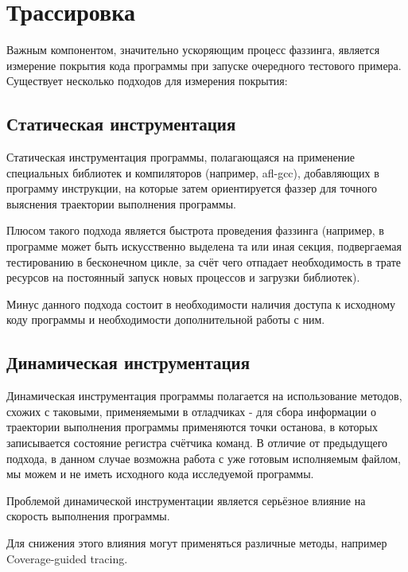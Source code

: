 \section{Трассировка}

Важным компонентом, значительно ускоряющим процесс фаззинга, является измерение покрытия кода программы при запуске очередного тестового примера. Существует несколько подходов для измерения покрытия:


\subsection{Статическая инструментация}

Статическая инструментация программы, полагающаяся на применение специальных библиотек и компиляторов (например, afl-gcc), добавляющих в программу инструкции, на которые затем ориентируется фаззер для точного выяснения траектории выполнения программы.  

Плюсом такого подхода является быстрота проведения фаззинга (например, в программе может быть искусственно выделена та или иная секция, подвергаемая тестированию в бесконечном цикле, за счёт чего отпадает необходимость в трате ресурсов на постоянный запуск новых процессов и загрузки библиотек).

Минус данного подхода состоит в необходимости наличия доступа к исходному коду программы и необходимости дополнительной работы с ним.

\subsection{Динамическая инструментация}

Динамическая инструментация программы полагается на использование методов, схожих с таковыми, применяемыми в отладчиках - для сбора информации о траектории выполнения программы применяются точки останова, в которых записывается состояние регистра счётчика команд. В отличие от предыдущего подхода, в данном случае возможна работа с уже готовым исполняемым файлом, мы можем и не иметь исходного кода исследуемой программы.

Проблемой динамической инструментации является серьёзное влияние на скорость выполнения программы. 

Для снижения этого влияния могут применяться различные методы, например Coverage-guided tracing.